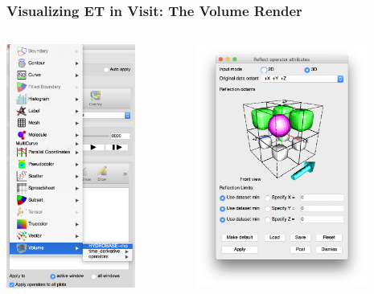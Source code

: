 \documentclass[]{beamer}
\begin{document}

\begin{frame}
  \frametitle{Visualizing ET in Visit: The Volume Render}
  \begin{columns}
    \begin{column}{6cm}
      \begin{center}
        \includegraphics[height=8cm]{figures/visit/visit-volume-render-start}
      \end{center}
    \end{column}
    \begin{column}{6cm}
      \begin{center}
        \includegraphics[height=8cm]{figures/visit/symmetry-star-and-midplane}
      \end{center}
    \end{column}
  \end{columns}
\end{frame}
\end{document}
